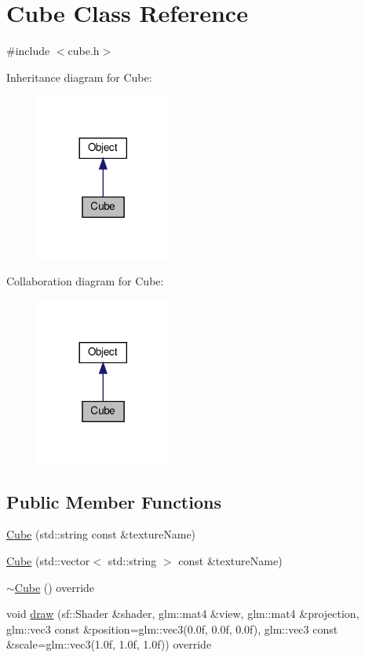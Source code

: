 \hypertarget{classCube}{}\section{Cube Class Reference}
\label{classCube}


{\ttfamily \#include $<$cube.\+h$>$}



Inheritance diagram for Cube\+:\nopagebreak
\begin{figure}[H]
\begin{center}
\leavevmode
\includegraphics[width=125pt]{classCube__inherit__graph}
\end{center}
\end{figure}


Collaboration diagram for Cube\+:\nopagebreak
\begin{figure}[H]
\begin{center}
\leavevmode
\includegraphics[width=125pt]{classCube__coll__graph}
\end{center}
\end{figure}
\subsection*{Public Member Functions}
\begin{DoxyCompactItemize}
\item 
\hyperlink{classCube_a41a92f10d372f9398b34d9d35d3ef720}{Cube} (std\+::string const \&texture\+Name)
\item 
\hyperlink{classCube_af45ed13232aae0b1271df4f61726a575}{Cube} (std\+::vector$<$ std\+::string $>$ const \&texture\+Name)
\item 
\hyperlink{classCube_a50a1ee10578a47a093c11e5d97ed4a29}{$\sim$\+Cube} () override
\item 
void \hyperlink{classCube_a0dfc84b5634e8c3f0fefd3482085e855}{draw} (sf\+::\+Shader \&shader, glm\+::mat4 \&view, glm\+::mat4 \&projection, glm\+::vec3 const \&position=glm\+::vec3(0.\+0f, 0.\+0f, 0.\+0f), glm\+::vec3 const \&scale=glm\+::vec3(1.\+0f, 1.\+0f, 1.\+0f)) override
\end{DoxyCompactItemize}
